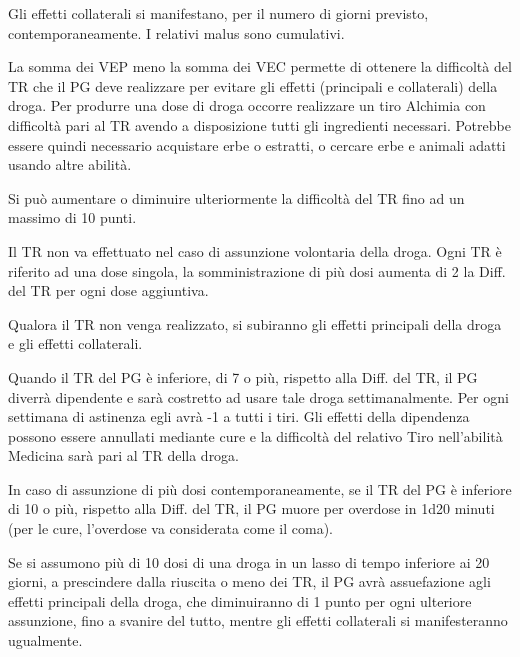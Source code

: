 
Gli effetti collaterali si manifestano, per il numero di giorni
previsto, contemporaneamente. I relativi malus sono cumulativi.

La somma dei VEP meno la somma dei VEC permette di ottenere la
difficolt\`a del TR che il PG deve realizzare per evitare gli effetti
(principali e collaterali) della droga. Per produrre una dose di droga
occorre realizzare un tiro Alchimia con difficolt\`a pari al TR avendo
a disposizione tutti gli ingredienti necessari.  Potrebbe essere
quindi necessario acquistare erbe o estratti, o cercare erbe e animali
adatti usando altre abilit\`a.

Si pu\`o aumentare o diminuire ulteriormente la difficolt\`a del
TR fino ad un massimo di 10 punti.


Il TR non va effettuato nel caso di assunzione volontaria della droga.
Ogni TR \`e riferito ad una dose singola, la somministrazione di pi\`u
dosi aumenta di 2 la Diff. del TR per ogni dose aggiuntiva.

Qualora il TR non venga realizzato, si subiranno gli effetti
principali della droga e gli effetti collaterali.

Quando il TR del PG \`e inferiore, di 7 o pi\`u, rispetto alla Diff.
del TR, il PG diverr\`a dipendente e sar\`a costretto ad usare tale
droga settimanalmente. Per ogni settimana di astinenza egli avr\`a -1
a tutti i tiri. Gli effetti della dipendenza possono essere annullati
mediante cure e la difficolt\`a del relativo Tiro nell'abilit\`a
Medicina sar\`a pari al TR della droga.

In caso di assunzione di pi\`u dosi contemporaneamente, se il TR del
PG \`e inferiore di 10 o pi\`u, rispetto alla Diff. del TR, il PG
muore per overdose in 1d20 minuti (per le cure, l'overdose va
considerata come il coma).

Se si assumono pi\`u di 10 dosi di una droga in un lasso di tempo
inferiore ai 20 giorni, a prescindere dalla riuscita o meno dei TR, il
PG avr\`a assuefazione agli effetti principali della droga, che
diminuiranno di 1 punto per ogni ulteriore assunzione, fino a svanire
del tutto, mentre gli effetti collaterali si manifesteranno
ugualmente. 

